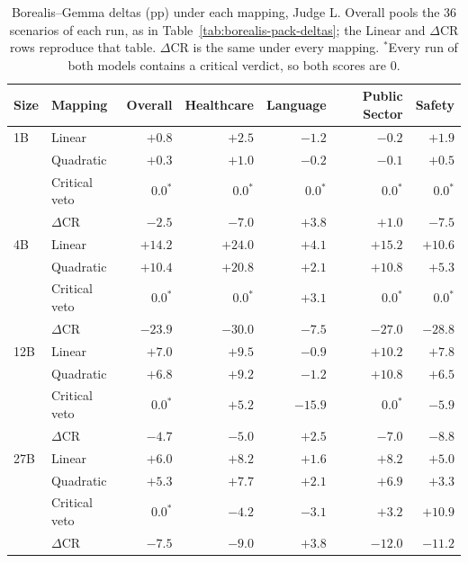 \begin{table}[h]
\centering
\caption{Borealis--Gemma deltas (pp) under each mapping, Judge L. Overall pools the 36 scenarios of each run, as in Table~\ref{tab:borealis-pack-deltas}; the Linear and $\Delta$CR rows reproduce that table. $\Delta$CR is the same under every mapping. $^{*}$Every run of both models contains a critical verdict, so both scores are 0.}
\label{tab:mapping-deltas}
\small
\setlength{\tabcolsep}{4pt}
\begin{tabular}{llrrrrr}
\toprule
Size & Mapping & Overall & Healthcare & Language & Public Sector & Safety \\
\midrule
1B & Linear & $+0.8$ & $+2.5$ & $-1.2$ & $-0.2$ & $+1.9$ \\
 & Quadratic & $+0.3$ & $+1.0$ & $-0.2$ & $-0.1$ & $+0.5$ \\
 & Critical veto & $0.0^{*}$ & $0.0^{*}$ & $0.0^{*}$ & $0.0^{*}$ & $0.0^{*}$ \\
 & $\Delta$CR & $-2.5$ & $-7.0$ & $+3.8$ & $+1.0$ & $-7.5$ \\
\midrule
4B & Linear & $+14.2$ & $+24.0$ & $+4.1$ & $+15.2$ & $+10.6$ \\
 & Quadratic & $+10.4$ & $+20.8$ & $+2.1$ & $+10.8$ & $+5.3$ \\
 & Critical veto & $0.0^{*}$ & $0.0^{*}$ & $+3.1$ & $0.0^{*}$ & $0.0^{*}$ \\
 & $\Delta$CR & $-23.9$ & $-30.0$ & $-7.5$ & $-27.0$ & $-28.8$ \\
\midrule
12B & Linear & $+7.0$ & $+9.5$ & $-0.9$ & $+10.2$ & $+7.8$ \\
 & Quadratic & $+6.8$ & $+9.2$ & $-1.2$ & $+10.8$ & $+6.5$ \\
 & Critical veto & $0.0^{*}$ & $+5.2$ & $-15.9$ & $0.0^{*}$ & $-5.9$ \\
 & $\Delta$CR & $-4.7$ & $-5.0$ & $+2.5$ & $-7.0$ & $-8.8$ \\
\midrule
27B & Linear & $+6.0$ & $+8.2$ & $+1.6$ & $+8.2$ & $+5.0$ \\
 & Quadratic & $+5.3$ & $+7.7$ & $+2.1$ & $+6.9$ & $+3.3$ \\
 & Critical veto & $0.0^{*}$ & $-4.2$ & $-3.1$ & $+3.2$ & $+10.9$ \\
 & $\Delta$CR & $-7.5$ & $-9.0$ & $+3.8$ & $-12.0$ & $-11.2$ \\
\bottomrule
\end{tabular}
\end{table}

